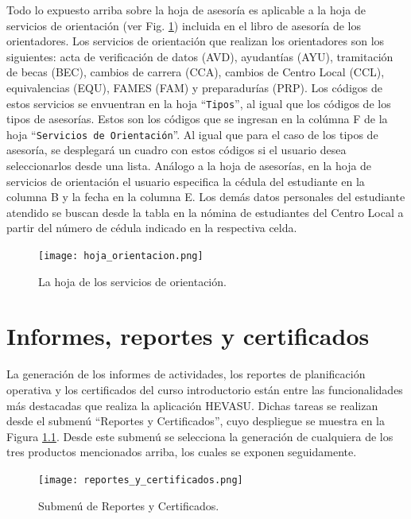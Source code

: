 \documentclass[letterpaper,12pt]{book}
\begin{document}
Todo lo expuesto arriba sobre la hoja de asesoría es aplicable a la hoja de servicios de orientación (ver Fig. \ref{fig:hoja_orientacion}) incluida en el libro de asesoría de los orientadores.  Los servicios de orientación que realizan los orientadores son los siguientes: acta de verificación de datos (AVD), ayudantías (AYU), tramitación de becas (BEC), cambios de carrera (CCA), cambios de Centro Local (CCL), equivalencias (EQU), FAMES (FAM) y preparadurías (PRP). Los códigos de estos servicios se envuentran en la hoja ``\texttt{Tipos}'', al igual que los códigos de los tipos de asesorías. Estos son los códigos que se ingresan en la colúmna F de la hoja ``\texttt{Servicios de Orientación}''. Al igual que para el caso de los tipos de asesoría, se desplegará un cuadro con estos códigos si el usuario desea seleccionarlos desde una lista. Análogo a la hoja de asesorías, en la hoja de servicios de orientación el usuario especifica la cédula del estudiante en la columna B y la fecha en la columna E. Los demás datos personales del estudiante atendido se buscan desde la tabla en la nómina de estudiantes del Centro Local a partir del número de cédula indicado en la respectiva celda. 

\begin{figure}[!ht]
  \centering
  \texttt{[image: hoja\_orientacion.png]}
  \caption{La hoja de los servicios de orientación.}
  \label{fig:hoja_orientacion}
\end{figure}

\chapter{Informes, reportes y certificados}\label{cap:generar_reportes}

La generación de los informes de actividades, los reportes de planificación operativa y los certificados del curso introductorio están entre las funcionalidades más destacadas que realiza la aplicación HEVASU.  Dichas tareas se realizan desde el submenú ``Reportes y Certificados'', cuyo despliegue se muestra en la Figura \ref{fig:reportes_y_certificados}.  Desde este submenú se selecciona la generación de cualquiera de los tres productos mencionados arriba, los cuales se exponen seguidamente.

\begin{figure}[!ht]
  \centering
  \texttt{[image: reportes\_y\_certificados.png]}
  \caption{Submenú de Reportes y Certificados.}
  \label{fig:reportes_y_certificados}
\end{figure}
\end{document}
